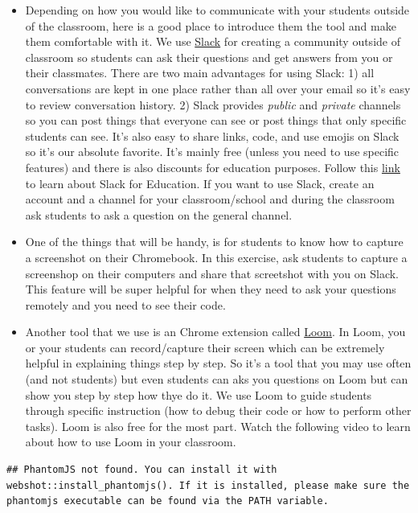 \documentclass[]{book}
\begin{document}
\begin{itemize}
\item
  Depending on how you would like to communicate with your students outside of the classroom, here is a good place to introduce them the tool and make them comfortable with it. We use \href{https://slack.com/}{Slack} for creating a community outside of classroom so students can ask their questions and get answers from you or their classmates. There are two main advantages for using Slack: 1) all conversations are kept in one place rather than all over your email so it's easy to review conversation history. 2) Slack provides \emph{public} and \emph{private} channels so you can post things that everyone can see or post things that only specific students can see. It's also easy to share links, code, and use emojis on Slack so it's our absolute favorite. It's mainly free (unless you need to use specific features) and there is also discounts for education purposes. Follow this \href{https://get.slack.help/hc/en-us/articles/206646877-Slack-for-Education}{link} to learn about Slack for Education. If you want to use Slack, create an account and a channel for your classroom/school and during the classroom ask students to ask a question on the general channel.
\item
  One of the things that will be handy, is for students to know how to capture a screenshot on their Chromebook. In this exercise, ask students to capture a screenshop on their computers and share that screetshot with you on Slack. This feature will be super helpful for when they need to ask your questions remotely and you need to see their code.
\item
  Another tool that we use is an Chrome extension called \href{https://www.useloom.com/}{Loom}. In Loom, you or your students can record/capture their screen which can be extremely helpful in explaining things step by step. So it's a tool that you may use often (and not students) but even students can aks you questions on Loom but can show you step by step how thye do it. We use Loom to guide students through specific instruction (how to debug their code or how to perform other tasks). Loom is also free for the most part. Watch the following video to learn about how to use Loom in your classroom.
\end{itemize}

\begin{verbatim}
## PhantomJS not found. You can install it with webshot::install_phantomjs(). If it is installed, please make sure the phantomjs executable can be found via the PATH variable.
\end{verbatim}
\end{document}
